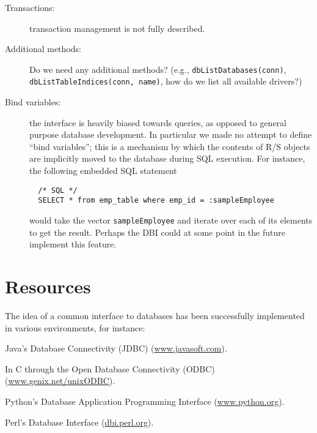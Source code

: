 \documentclass{article}
\newcommand{\sobj}[1]{\mbox{\tt #1}}    %
\newcommand{\sexp}[1]{\mbox{\tt #1}}    %
\begin{document}
\begin{description}
\item[Transactions:]
  transaction management is not fully described.

\item[Additional methods:]
  Do we need any additional methods? (e.g., \sexp{dbListDatabases(conn)},
  \sexp{dbListTableIndices(conn, name)}, 
  how do we list all available drivers?)

\item[Bind variables:]
  the interface is heavily biased towards queries, as opposed to
  general purpose database development.  In particular we made
  no attempt to define ``bind variables''; this is a mechanism
  by which the contents of R/S objects are implicitly moved to
  the database during SQL execution.  For instance, the following
  embedded SQL statement

\begin{verbatim}
  /* SQL */
  SELECT * from emp_table where emp_id = :sampleEmployee
\end{verbatim}
  would take the vector \sobj{sampleEmployee} and iterate over each
  of its elements to get the result.  Perhaps the DBI could at some
  point in the future implement this feature.

\end{description}

\section{Resources}\label{sec:resources}
The idea of a common interface to databases has been successfully
implemented in various environments, for instance:

Java's Database Connectivity (JDBC)
(\href{http://www.javasoft.com/products/jdbc/index.html}{www.javasoft.com}).

In C through the Open Database Connectivity (ODBC)
(\href{http://www.genix.net/unixODBC}{www.genix.net/unixODBC}).

Python's Database Application Programming Interface
(\href{http://www.python.org/topics/database}{www.python.org}).

Perl's Database Interface
(\href{http://dbi.perl.org}{dbi.perl.org}).

\nocite{*}


\end{document}
